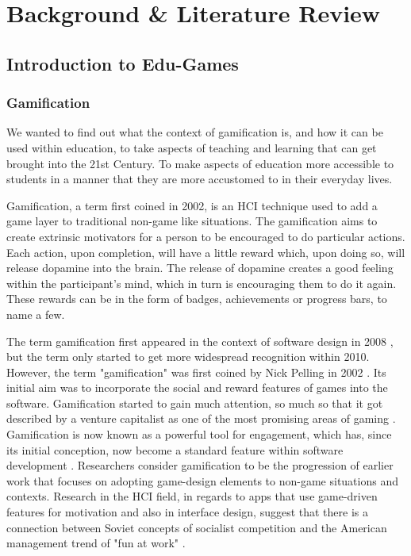 \chapter{Background \& Literature Review}
	\label{chap:background_lit_review}
	
	
	\section{Introduction to Edu-Games}
	
	
	
	\subsection{Gamification}
	We wanted to find out what the context of gamification is, and how it can be used within education, to take aspects of teaching and learning that can get brought into the 21st Century. To make aspects of education more accessible to students in a manner that they are more accustomed to in their everyday lives. 
	
	Gamification, a term first coined in 2002, is an HCI technique used to add a game layer to traditional non-game like situations. The gamification aims to create extrinsic motivators for a person to be encouraged to do particular actions. Each action, upon completion, will have a little reward which, upon doing so, will release dopamine into the brain. The release of dopamine creates a good feeling within the participant's mind, which in turn is encouraging them to do it again. These rewards can be in the form of badges, achievements or progress bars, to name a few.
	
	The term gamification first appeared in the context of software design in 2008 \cite{4}, but the term only started to get more widespread recognition within 2010. However, the term "gamification" was first coined by Nick Pelling in 2002 \cite{3e}. Its initial aim was to incorporate the social and reward features of games into the software. Gamification started to gain much attention, so much so that it got described by a venture capitalist as one of the most promising areas of gaming \cite{5}. Gamification is now known as a powerful tool for engagement, which has, since its initial conception, now become a standard feature within software development \cite{3e}. Researchers consider gamification to be the progression of earlier work that focuses on adopting game-design elements to non-game situations and contexts. Research in the HCI field, in regards to apps that use game-driven features for motivation and also in interface design, suggest that there is a connection between Soviet concepts of socialist competition and the American management trend of "fun at work" \cite{5}. 
	
